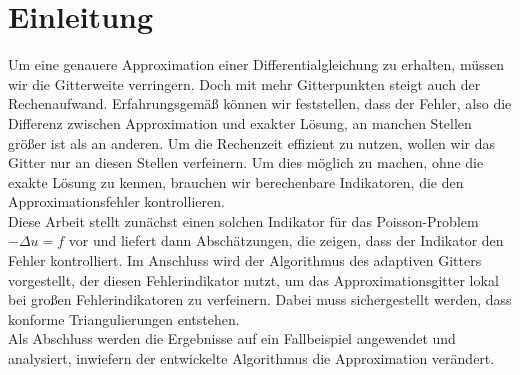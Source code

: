 \chapter{Einleitung}
\renewcommand{\thepage}{\arabic{page}}
\setcounter{page}{1}
Um eine genauere Approximation einer Differentialgleichung zu erhalten, müssen wir die Gitterweite verringern. Doch mit mehr Gitterpunkten steigt auch der Rechenaufwand. Erfahrungsgemäß können wir feststellen, dass der Fehler, also die Differenz zwischen Approximation und exakter Lösung, an manchen Stellen größer ist als an anderen. Um die Rechenzeit effizient zu nutzen, wollen wir das Gitter nur an diesen Stellen verfeinern. Um dies möglich zu machen, ohne die exakte Lösung zu kennen, brauchen wir berechenbare Indikatoren, die den Approximationsfehler kontrollieren. \\
Diese Arbeit stellt zunächst einen solchen Indikator für das Poisson-Problem $-\Delta u =f$ vor und liefert dann  Abschätzungen, die zeigen, dass der Indikator den Fehler kontrolliert. Im Anschluss wird der Algorithmus des adaptiven Gitters vorgestellt, der diesen Fehlerindikator nutzt, um das Approximationsgitter lokal bei großen Fehlerindikatoren zu verfeinern. Dabei muss sichergestellt werden, dass konforme Triangulierungen entstehen. \\
Als Abschluss werden die Ergebnisse auf ein Fallbeispiel angewendet und analysiert, inwiefern der entwickelte Algorithmus die Approximation verändert.